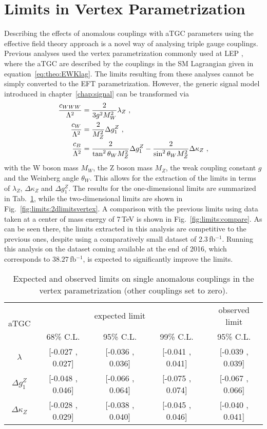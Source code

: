 \section{Limits in Vertex Parametrization}
\label{sec:vertex}
Describing the effects of anomalous couplings with aTGC parameters using the effective field theory approach is a novel way of analysing triple gauge couplings. Previous analyses used the vertex parametrization commonly used at LEP \cite{LEPatgc}, where the aTGC are described by the couplings in the SM Lagrangian given in equation~\ref{eq:theo:EWKlag}. The limits resulting from these analyses cannot be simply converted to the EFT parametrization. However, the generic signal model introduced in chapter~\ref{chap:signal} can be transformed via
\begin{align}
\frac{c_{WWW}}{\Lambda^2} &= \frac{2}{3g^2M_W^2}\lambda_Z ~, \\
\frac{c_{W}}{\Lambda^2}  &= \frac{2}{M_Z^2}\Delta g_1^Z ~, \\
\frac{c_{B}}{\Lambda^2}   &= \frac{2}{\tan^2\theta_W M_Z^2}\Delta g_1^Z - \frac{2}{\sin^2\theta_W M_Z^2}\Delta\kappa_Z ~,
\end{align}
with the W boson mass $M_W$, the Z boson mass $M_Z$, the weak coupling constant $g$ and the Weinberg angle $\theta_W$. This allows for the extraction of the limits in terms of $\lambda_Z$, $\Delta \kappa_Z$ and $\Delta g_1^Z$. The results for the one-dimensional limits are summarized in Tab.~\ref{tab:limits:1dlimits_vertex}, while the two-dimensional limits are shown in Fig.~\ref{fig:limits:2dlimitsvertex}. A comparison with the previous limits using data taken at a center of mass energy of 7\,TeV is shown in Fig.~\ref{fig:limits:compare}. As can be seen there, the limits extracted in this analysis are competitive to the previous ones, despite using a comparatively small dataset of 2.3\,fb$^{-1}$. Running this analysis on the dataset coming available at the end of 2016, which corresponds to $38.27$\,fb$^{-1}$, is expected to significantly improve the limits.

\begin{table}
	\centering
	\caption[Expected and observed limits on single anomalous couplings in the vertex parametrization]{Expected and observed limits on single anomalous couplings in the vertex parametrization (other couplings set to zero).}
	\label{tab:limits:1dlimits_vertex}
	\begin{tabular}{ccccc}
	\hline
	\multirow{2}{*}{aTGC}              &     \multicolumn{3}{c}{expected limit} & observed limit\\
	& 68\% C.L. & 95\% C.L. & 99\% C.L. & 95\% C.L.\\
	\hline
	$\lambda$          & [-0.027 , 0.027] & [-0.036 , 0.036] & [-0.041 , 0.041] & [-0.039 , 0.039] \\
	$\Delta g_1^Z$     & [-0.048 , 0.046] & [-0.066 , 0.064] & [-0.075 , 0.074] & [-0.067 , 0.066] \\
	$\Delta\kappa_Z$   & [-0.028 , 0.029] & [-0.038 , 0.040] & [-0.045 , 0.046] & [-0.040 , 0.041] \\
	\hline
	\end{tabular}
\end{table}

